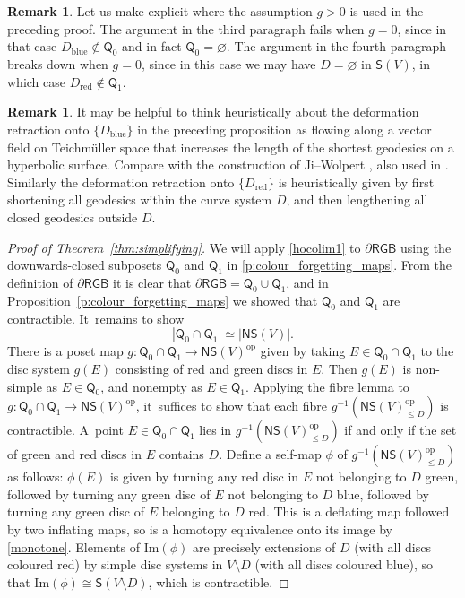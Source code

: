 \documentclass[11pt]{article}
\theoremstyle{plain}
\theoremstyle{definition}
\newtheorem{rem}[thm]{Remark}
\newcommand{\dRGB}{\partial\mathsf{RGB}}
\newcommand{\NS}{\mathsf{NS}}
\newcommand{\SD}{\mathsf{S}}
\begin{document}
\begin{rem}
Let us make explicit where the assumption $g>0$ is used in the preceding proof. The argument in the third paragraph fails when $g=0$, since in that case $D_{\mathrm{blue}} \notin \mathsf Q_0$ and in fact $\mathsf Q_0 = \varnothing$. The argument in the fourth paragraph breaks down when $g=0$, since in this case we may have $D=\varnothing$ in $\SD(V)$, in which case $D_{\mathrm{red}} \notin \mathsf Q_1$.
\end{rem}

\begin{rem}
It may be helpful to think heuristically about the deformation retraction onto $\{D_{\mathrm{blue}}\}$ in the preceding proposition as flowing along a vector field on Teichmüller space that increases the length of the shortest geodesics on a hyperbolic surface. Compare with the construction of Ji--Wolpert \cite[\S 3]{jiwolpert}, also used in \cite{hainautpetersen}. Similarly the deformation retraction onto $\{D_{\mathrm{red}}\}$ is heuristically given by first shortening all geodesics within the curve system $D$, and then lengthening all closed geodesics outside $D$.
\end{rem}

\begin{proof}[Proof of Theorem~\ref{thm:simplifying}]
We will apply \cref{hocolim1} to $\dRGB$ using the downwards-closed subposets $\mathsf Q_0$ and $\mathsf Q_1$ in \cref{p:colour_forgetting_maps}. From the definition of $\dRGB$ it is clear that $\dRGB =\mathsf Q_0 \cup \mathsf Q_1$, and in Proposition~\ref{p:colour_forgetting_maps} we showed that $\mathsf Q_0$ and $\mathsf Q_1$ are contractible. It~remains to show
\[
|\mathsf Q_0 \cap \mathsf Q_1|\simeq |\NS(V)|.
\]
There is a poset map $g:\mathsf Q_0 \cap \mathsf Q_1\to \NS(V)^{\text{op}}$ given by taking $E \in \mathsf Q_0 \cap \mathsf Q_1$ to the disc system $g(E)$ consisting of red and green discs in $E$. Then $g(E)$ is non-simple as $E \in \mathsf Q_0$, and nonempty as $E \in \mathsf Q_1$. Applying the fibre lemma to $g:\mathsf Q_0 \cap \mathsf Q_1\to \NS(V)^{\text{op}}$, it~suffices to show that each fibre $g^{-1}(\NS(V)^\text{op}_{\leq D})$ is contractible. A~point $E \in \mathsf Q_0 \cap \mathsf Q_1$ lies in $g^{-1}(\NS(V)^\text{op}_{\leq D})$ if and only if the set of green and red discs in $E$ contains $D$. Define a self-map $\phi$ of $g^{-1}(\NS(V)^\text{op}_{\leq D})$ as follows: $\phi(E)$ is given by turning any red disc in $E$ not belonging to $D$ green, followed by turning any green disc of $E$ not belonging to $D$ blue, followed by turning any green disc of $E$ belonging to $D$ red. This is a deflating map followed by two inflating maps, so is a homotopy equivalence onto its image by \cref{monotone}. Elements of $\mathrm{Im}(\phi)$ are precisely extensions of $D$ (with all discs coloured red) by simple disc systems in $V \setminus D$ (with all discs coloured blue), so that $\mathrm{Im}(\phi) \cong \SD(V\setminus D)$, which is contractible.
\end{proof}
\end{document}
